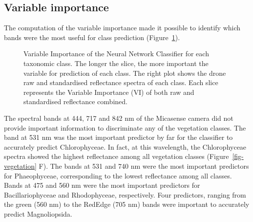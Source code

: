 \documentclass[
  number]{elsarticle}
\begin{document}
\subsection{Variable importance}\label{variable-importance-1}

The computation of the variable importance made it possible to identify
which bands were the most useful for class prediction
(Figure~\ref{fig-VIP}).

\label{cell-fig-VIP}
\begin{figure}[H]


\caption{\label{fig-VIP}Variable Importance of the Neural Network
Classifier for each taxonomic class. The longer the slice, the more
important the variable for prediction of each class. The right plot
shows the drone raw and standardised reflectance spectra of each class.
Each slice represents the Variable Importance (VI) of both raw and
standardised reflectance combined.}

\end{figure}%

The spectral bands at 444, 717 and 842 nm of the Micasense camera did
not provide important information to discriminate any of the vegetation
classes. The band at 531 nm was the most important predictor by far for
the classifier to accurately predict Chlorophyceae. In fact, at this
wavelength, the Chlorophyceae spectra showed the highest reflectance
among all vegetation classes (Figure~\ref{fig-vegetation} F). The bands
at 531 and 740 nm were the most important predictors for Phaeophyceae,
corresponding to the lowest reflectance among all classes. Bands at 475
and 560 nm were the most important predictors for Bacillariophyceae and
Rhodophyceae, respectively. Four predictors, ranging from the green (560
nm) to the RedEdge (705 nm) bands were important to accurately predict
Magnoliopsida.
\end{document}
